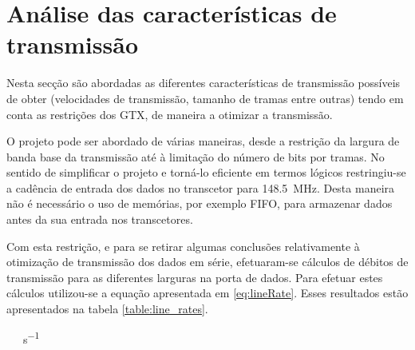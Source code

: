 \section{Análise das características de transmissão}

Nesta secção são abordadas as diferentes características de transmissão possíveis de obter (velocidades de transmissão, tamanho de tramas entre outras) tendo em conta as restrições dos GTX, de maneira a otimizar a transmissão.

O projeto pode ser abordado de várias maneiras, desde a restrição da largura de banda base da transmissão até à limitação do número de bits por tramas. No sentido de simplificar o projeto e torná-lo eficiente em termos lógicos restringiu-se a cadência de entrada dos dados no transcetor para \SI{148.5}{\mega\hertz}. Desta maneira não é necessário o uso de memórias, por exemplo FIFO, para armazenar dados antes da sua entrada nos transcetores.

Com esta restrição, e para se retirar algumas conclusões relativamente à otimização de transmissão dos dados em série, efetuaram-se cálculos de débitos de transmissão para as diferentes larguras na porta de dados. Para efetuar estes cálculos utilizou-se a equação apresentada em \ref{eq:lineRate}. Esses resultados estão apresentados na tabela \ref{table:line_rates}.



\SI{}{\giga\bit\per\second}


